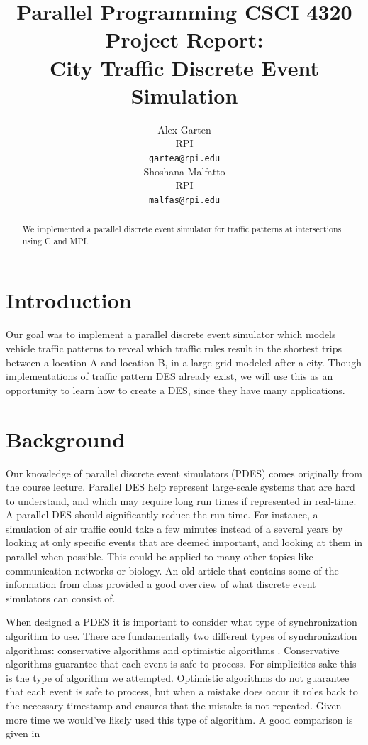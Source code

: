 \documentclass[10pt,a4paper]{article}
\title{Parallel Programming CSCI 4320 Project Report: \\
    City Traffic Discrete Event Simulation}
\author{Alex Garten \\
      RPI \\
      \texttt{gartea@rpi.edu} \\\And
      Shoshana Malfatto \\
      RPI \\
      \texttt{malfas@rpi.edu} \\}
\date{}
\begin{document}
    \maketitle
    \begin{abstract}
        We implemented a parallel discrete event simulator for traffic patterns at intersections using C and MPI.
    \end{abstract}
    
    \section{Introduction}
    
    Our goal was to implement a parallel discrete event simulator which models vehicle traffic patterns to reveal which traffic rules result in the shortest trips between a location A and location B, in a large grid modeled after a city. Though implementations of traffic pattern DES already exist, we will use this as an opportunity to learn how to create a DES, since they have many applications.
    
    \section{Background}
    Our knowledge of parallel discrete event simulators (PDES) comes originally from the course lecture. Parallel DES help represent large-scale systems that are hard to understand, and which may require long run times if represented in real-time. A parallel DES should significantly reduce the run time. For instance, a simulation of air traffic could take a few minutes instead of a several years by looking at only specific events that are deemed important, and looking at them in parallel when possible. This could be applied to many other topics like communication networks or biology. An old article \cite{Fujimoto:1990:PDE:84537.84545} that contains some of the information from class provided a good overview of what discrete event simulators can consist of.
    
    When designed a PDES it is important to consider what type of synchronization algorithm to use. There are fundamentally two different types of synchronization algorithms: conservative algorithms and optimistic algorithms \cite{Fujimoto:1993:PDD:256563.256596}. Conservative algorithms guarantee that each event is safe to process. For simplicities sake this is the type of algorithm we attempted. Optimistic algorithms do not guarantee that each event is safe to process, but when a mistake does occur it roles back to the necessary timestamp and ensures that the mistake is not repeated. Given more time we would've likely used this type of algorithm. A good comparison is given in \cite{Carothers:2010}
    
\end{document}
